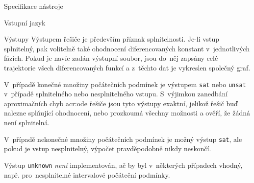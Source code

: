 \documentclass[thesis=M,czech]{FITthesis}[2012/06/26]
\newcommand{\acrlabel}[1]{acr:#1}
\newcommand{\acr}[1]{\acrshort{\acrlabel{#1}}}
\newcommand{\id}[1]{\texttt{#1}}
\newcommand{\hl}[1]{\textit{#1}}
\begin{document}
\begin{section}{Specifikace nástroje}
\begin{subsection}{Vstupní jazyk}

\end{subsection} %


\begin{subsection}{Výstupy}\label{ss:design:spec:out}
Výstupem řešiče je především příznak splnitelnosti.
Je-li vstup splnitelný,
pak volitelně také ohodnocení diferencovaných konstant
v~jednotlivých fázích.
Pokud je navíc zadán výstupní soubor,
jsou do~něj zapsány celé trajektorie
všech diferencovaných funkcí
a z~těchto dat je vykreslen společný graf.

V~případě konečné množiny počátečních podmínek
je výstupem \id{sat} nebo \id{unsat}
v~případě splnitelného nebo nesplnitelného vstupu.
S~výjimkou zanedbání aproximačních chyb \acr{ode} řešiče
jsou tyto výstupy exaktní,
jelikož řešič buď nalezne splňující ohodnocení,
nebo prozkoumá všechny možnosti a ověří, že žádná není splnitelná.

V~případě nekonečné množiny počátečních podmínek
je možný výstup \id{sat},
ale pokud je vstup nesplnitelný,
výpočet pravděpodobně nikdy neskončí.

Výstup \id{unknown} \hl{není} implementován,
ač by byl v~některých případech vhodný,
např. pro~nesplnitelné intervalové počáteční podmínky.
\end{subsection} %


\end{section} %

\end{document}
